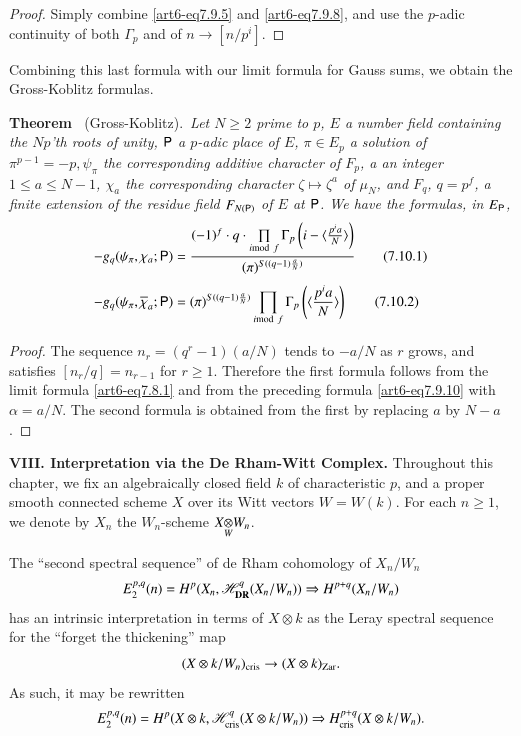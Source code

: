 \begin{proof}
Simply combine \eqref{art6-eq7.9.5} and \eqref{art6-eq7.9.8}, and use the $p$-adic continuity of both $\Gamma_{p}$ and of $n\to [n/p^{i}]$.
\end{proof}

Combining this last formula with our limit formula for Gauss sums, we obtain the Gross-Koblitz formulas.

\medskip
\noindent
{\bf Theorem \label{art6-thm7.10}}~(Gross-Koblitz).~{\em Let $N\geq 2$ prime to $p$, $E$ a number field containing the $Np$'th roots of unity, $\mathsf{P}$ a $p$-adic place of $E$, $\pi \in E_{p}$ a solution of $\pi^{p-1}=-p,\psi_{\pi}$ the corresponding additive character of $F_{p}$, a an integer $1\leq a\leq N-1$, $\chi_{a}$ the corresponding character $\zeta\mapsto \zeta^{a}$ of $\mu_{N}$, and $F_{q}$, $q=p^{f}$, a finite extension of the residue field $F_{N(\mathsf{P})}$ of $E$ at $\mathsf{P}$. We have the formulas, in $E_{\mathsf{P}}$,}
\begin{align*}
-g_{q}(\psi_{\pi},\chi_{a};\mathsf{P}) &= \frac{(-1)^{f}\cdot q\cdot \prod\limits_{i{\rm{mod}}\kern.3em f}\Gamma_{p}\left(i-\langle \frac{p^{i}a}{N}\rangle \right)}{(\pi)^{S((q-1)\frac{a}{N})}}\tag{7.10.1}\label{art6-eq7.10.1}\\[4pt]
-g_{q}(\psi_{\pi},\overline{\chi}_{a};\mathsf{P}) &=(\pi)^{S((q-1)\frac{a}{N})}\prod\limits_{i{\rm{mod}}\kern.3em f}\Gamma_{p}\left(\langle \frac{p^{i}a}{N}\rangle\right)\tag{7.10.2}\label{art6-eq7.10.2}
\end{align*}

\begin{proof}
The sequence $n_{r}=(q^{r}-1)(a/N)$ tends to $-a/N$ as $r$ grows, and satisfies $[n_{r}/q]=n_{r-1}$ for $r\geq 1$. Therefore the first formula follows from the limit formula \eqref{art6-eq7.8.1} and from the preceding formula \eqref{art6-eq7.9.10} with $\alpha=a/N$. The second formula is obtained from the first by replacing $a$ by $N-a$.
\end{proof}

\bigskip
\noindent
{\bf VIII. Interpretation via the De Rham-Witt Complex.}\pageoriginale
Throughout this chapter, we fix an algebraically closed field $k$ of characteristic $p$, and a proper smooth connected scheme $X$ over its Witt vectors $W=W(k)$. For each $n\geq 1$, we denote by $X_{n}$ the $W_{n}$-scheme $\foprod{X}{W_{n}}{W}$.

The ``second spectral sequence'' of de Rham cohomology of $X_{n}/W_{n}$ 
$$
E^{p,q}_{2}(n)=H^{p}(X_{n},\mathscr{H}^{q}_{\mathbf{DR}}(X_{n}/W_{n}))\Rightarrow H^{p+q}(X_{n}/W_{n})
$$
has an intrinsic interpretation in terms of $X\otimes k$ as the Leray spectral sequence for the ``forget the thickening'' map
$$
(X\otimes k/W_{n})_{\operatorname{cris}}\to (X\otimes k)_{\text{Zar}}.
$$
As such, it may be rewritten
$$
E^{p,q}_{2}(n)=H^{p}(X\otimes k,\mathscr{H}^{q}_{\operatorname{cris}}(X\otimes k/W_{n}))\Rightarrow H^{p+q}_{\operatorname{cris}}(X\otimes k/W_{n}).
$$

